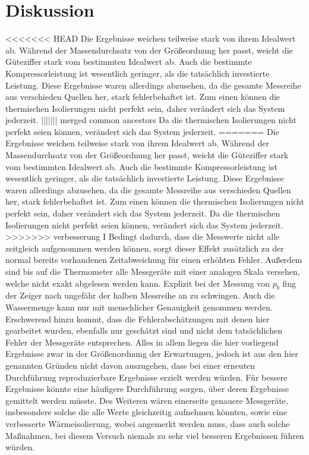 \section{Diskussion}
\label{sec:Diskussion}
<<<<<<< HEAD
Die Ergebnisse weichen teilweise stark von ihrem Idealwert ab. Während der Massendurchsatz von der Größeordnung her passt, weicht die Güteziffer stark vom bestimmten Idealwert ab.
Auch die bestimmte Kompressorleistung ist wesentlich geringer, als die tatsächlich investierte Leistung.
Diese Ergebnisse waren allerdings abzusehen, da die gesamte Messreihe aus verschieden Quellen her, stark fehlerbehaftet ist.
Zum einen können die thermischen Isolierungen nicht perfekt sein, daher verändert sich das System jederzeit.
||||||| merged common ancestors
Da die thermischen Isolierungen nicht perfekt seien können, verändert sich das System jederzeit.
=======
Die Ergebnisse weichen teilweise stark von ihrem Idealwert ab. Während der Massendurchsatz von der Größeordnung her passt, weicht die Güteziffer stark vom bestimmten Idealwert ab.
Auch die bestimmte Kompressorleistung ist wesentlich geringer, als die tatsächlich investierte Leistung.
Diese Ergebnisse waren allerdings abzusehen, da die gesamte Messreihe aus verschieden Quellen her, stark fehlerbehaftet ist.
Zum einen können die thermischen Isolierungen nicht perfekt sein, daher verändert sich das System jederzeit.
Da die thermischen Isolierungen nicht perfekt seien können, verändert sich das System jederzeit.
>>>>>>> verbesserung I
Bedingt dadurch, dass die Messwerte nicht alle zeitgleich aufgenommen werden können, sorgt dieser Effekt zusätzlich zu der normal bereits vorhandenen Zeitabweichung für einen erhöhten Fehler.
Außerdem sind bis auf die Thermometer alle Messgeräte mit einer analogen Skala versehen, welche nicht exakt abgelesen werden kann. Explizit bei der Messung von $p_b$ fing der Zeiger nach ungefähr der halben Messreihe an zu schwingen.
Auch die Wassermenge kann nur mit menschlicher Genauigkeit genommen werden.
Erschwerend hinzu kommt, dass die Fehlerabschätzungen mit denen hier gearbeitet wurden, ebenfalls nur geschätzt sind und nicht dem tatsächlichen Fehler der Messgeräte entsprechen.
Alles in allem liegen die hier vorliegend Ergebnisse zwar in der Größenordnung der Erwartungen, jedoch ist aus den hier genannten Gründen nicht davon auszugehen, dass bei einer erneuten Durchführung reproduzierbare Ergebnisse erzielt werden würden.
Für bessere Ergebnisse könnte eine häufigere Durchführung sorgen, über deren Ergebnisse gemittelt werden müsste.
Des Weiteren wären einerseits genauere Messgeräte, insbesondere solche die alle Werte gleichzeitig aufnehmen könnten, sowie eine verbesserte Wärmeisolierung, 
wobei angemerkt werden muss, dass auch solche Maßnahmen, bei diesem Versuch niemals zu sehr viel besseren Ergebnissen führen würden.
